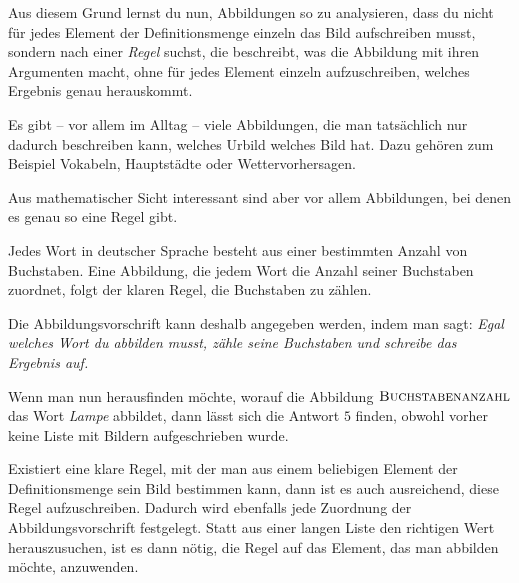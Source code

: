 \documentclass[../../main.tex]{subfiles}
\begin{document}
Aus diesem Grund lernst du nun, Abbildungen so zu analysieren, dass du nicht für jedes Element der Definitionsmenge einzeln das Bild aufschreiben musst, sondern nach einer \emph{Regel} suchst, die beschreibt, was die Abbildung mit ihren Argumenten macht, ohne für jedes Element einzeln aufzuschreiben, welches Ergebnis genau herauskommt. 

Es gibt -- vor allem im Alltag -- viele Abbildungen, die man tatsächlich nur dadurch beschreiben kann, welches Urbild welches Bild hat. Dazu gehören zum Beispiel Vokabeln, Hauptstädte oder Wettervorhersagen.

Aus mathematischer Sicht interessant sind aber vor allem Abbildungen, bei denen es genau so eine Regel gibt.

\begin{example}{}

    Jedes Wort in deutscher Sprache besteht aus einer bestimmten Anzahl von Buchstaben. Eine Abbildung, die jedem Wort die Anzahl seiner Buchstaben zuordnet, folgt der klaren Regel, die Buchstaben zu zählen.
    
    Die Abbildungsvorschrift kann deshalb angegeben werden, indem man sagt: \emph{Egal welches Wort du abbilden musst, zähle seine Buchstaben und schreibe das Ergebnis auf.} 
    
    Wenn man nun herausfinden möchte, worauf die Abbildung $\textsc{Buchstabenanzahl}$ das Wort \emph{Lampe} abbildet, dann lässt sich die Antwort $5$ finden, obwohl vorher keine Liste mit Bildern aufgeschrieben wurde.
\end{example}

Existiert eine klare Regel, mit der man aus einem beliebigen Element der Definitionsmenge sein Bild bestimmen kann, dann ist es auch ausreichend, diese Regel aufzuschreiben. Dadurch wird ebenfalls jede Zuordnung der Abbildungsvorschrift festgelegt. Statt aus einer langen Liste den richtigen Wert herauszusuchen, ist es dann nötig, die Regel auf das Element, das man abbilden möchte, anzuwenden.
\end{document}
